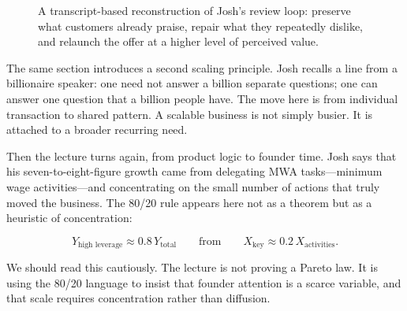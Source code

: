 \begin{figure}[h]
\centering
{}

\smallskip
{\small A transcript-based reconstruction of Josh's review loop: preserve what customers already praise, repair what they repeatedly dislike, and relaunch the offer at a higher level of perceived value.}
\end{figure}

The same section introduces a second scaling principle. Josh recalls a line from a billionaire speaker: one need not answer a billion separate questions; one can answer one question that a billion people have. The move here is from individual transaction to shared pattern. A scalable business is not simply busier. It is attached to a broader recurring need.

Then the lecture turns again, from product logic to founder time. Josh says that his seven-to-eight-figure growth came from delegating MWA tasks---minimum wage activities---and concentrating on the small number of actions that truly moved the business. The 80/20 rule appears here not as a theorem but as a heuristic of concentration:

\begin{equation}
Y_{\text{high leverage}} \approx 0.8\,Y_{\text{total}}
\qquad \text{from} \qquad
X_{\text{key}} \approx 0.2\,X_{\text{activities}}.
\end{equation}

We should read this cautiously. The lecture is not proving a Pareto law. It is using the 80/20 language to insist that founder attention is a scarce variable, and that scale requires concentration rather than diffusion.


